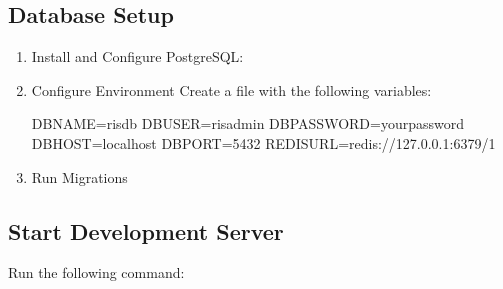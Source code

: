 \documentclass[letterpaper,10pt,english]{sphinxmanual}
\begin{document}
\subsection{Database Setup}
\label{\detokenize{getting_started/index:database-setup}}\begin{enumerate}
%
\item {} 
\sphinxAtStartPar
Install and Configure PostgreSQL:

\begin{sphinxVerbatim}[commandchars=\\\{\}]
\end{sphinxVerbatim}

\item {} 
\sphinxAtStartPar
Configure Environment
Create a  file with the following variables:

\begin{sphinxVerbatim}[commandchars=\\\{\}]
DB\PYGZus{}NAME=ris\PYGZus{}db
DB\PYGZus{}USER=ris\PYGZus{}admin
DB\PYGZus{}PASSWORD=yourpassword
DB\PYGZus{}HOST=localhost
DB\PYGZus{}PORT=5432
REDIS\PYGZus{}URL=redis://127.0.0.1:6379/1
\end{sphinxVerbatim}

\item {} 
\sphinxAtStartPar
Run Migrations

\begin{sphinxVerbatim}[commandchars=\\\{\}]
  
\end{sphinxVerbatim}

\end{enumerate}


\subsection{Start Development Server}
\label{\detokenize{getting_started/index:start-development-server}}
\sphinxAtStartPar
Run the following command:
\end{document}
